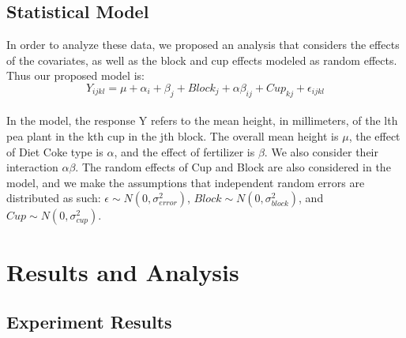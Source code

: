 \documentclass[1p,12pt]{elsarticle}\usepackage[]{graphicx}\usepackage[]{color}
\begin{document}
\subsection{Statistical Model}
In order to analyze these data, we proposed an analysis that considers the effects of the covariates, as well as the block and cup effects modeled as random effects. Thus our proposed model is: 
\\
\begin{equation}
Y_{ijkl} = \mu + \alpha_i + \beta_j + Block_j + \alpha\beta_{ij}+ Cup_{kj} + \epsilon_{ijkl}
\end{equation}
\\
In the model, the response Y refers to the mean height, in millimeters, of the lth pea plant in the kth cup in the jth block. The overall mean height is $\mu$, the effect of Diet Coke type is $\alpha$, and the effect of fertilizer is $\beta$. We also consider their interaction $\alpha\beta$. The random effects of Cup and Block are also considered in the model, and we make the assumptions that independent random errors are distributed as such: $\epsilon \sim N(0,\sigma^2_{error})$, $Block \sim N(0,\sigma^2_{block})$, and $Cup \sim N(0,\sigma^2_{cup})$. 





\section{Results and Analysis}
\subsection{Experiment Results}
\end{document}
